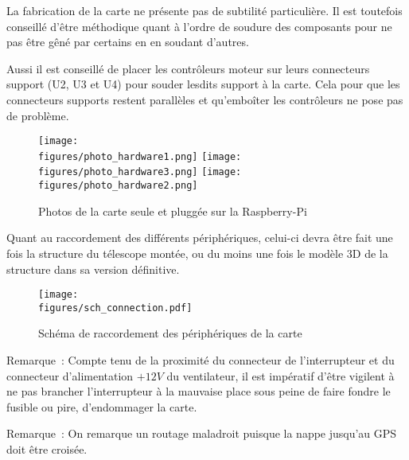 La fabrication de la carte ne présente pas de subtilité particulière. Il est toutefois conseillé d'être méthodique quant à l'ordre de soudure des composants pour ne pas être gêné par certains en en soudant d'autres.

Aussi il est conseillé de placer les contrôleurs moteur sur leurs connecteurs support (U2, U3 et U4) pour souder lesdits support à la carte. Cela pour que les connecteurs supports restent parallèles et qu'emboîter les contrôleurs ne pose pas de problème.

\begin{figure}[H]
    \centering
	\texttt{[image: \\figures/photo\_hardware1.png]}
	\texttt{[image: \\figures/photo\_hardware3.png]}
	\texttt{[image: \\figures/photo\_hardware2.png]}
    \decoRule
    \caption[
    Photos de la carte seule et pluggée sur la Raspberry-Pi]{
    Photos de la carte seule et pluggée sur la Raspberry-Pi}
    \label{fig:Photos de la carte seule et pluggée sur la Raspberry-Pi}
	\end{figure}

\vspace{1cm}

Quant au raccordement des différents périphériques, celui-ci devra être fait une fois la structure du télescope montée, ou du moins une fois le modèle 3D de la structure dans sa version définitive.

\begin{figure}[H]
    \centering
	\texttt{[image: \\figures/sch\_connection.pdf]}
    \decoRule
    \caption[
    Schéma de raccordement des périphériques de la carte]{
    Schéma de raccordement des périphériques de la carte}
    \label{fig:Schéma de raccordement des périphériques de la carte}
	\end{figure}


\vspace{1cm}

Remarque~: Compte tenu de la proximité du connecteur de l'interrupteur  et du connecteur d'alimentation $+12V$ du ventilateur, il est impératif d'être vigilent à ne pas brancher l'interrupteur à la mauvaise place sous peine de faire fondre le fusible ou pire, d'endommager la carte.

\vspace{1cm}

Remarque~: On remarque un routage maladroit puisque la nappe jusqu'au GPS doit être croisée.

